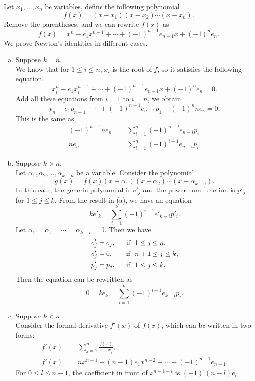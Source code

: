 \documentclass[a4paper, 12pt]{article}
\begin{document}
\begin{solution}
Let \(x_1,\ldots,x_n\) be variables, define the following polynomial 
\[f(x)=(x-x_1)(x-x_2)\cdots (x-x_n).\]
Remove the parentheses, and we can rewrite \(f(x)\) as 
\[f(x)=x^n-e_1x^{n-1}+\cdots+(-1)^{n-1}e_{n-1}x+(-1)^n e_n.\]
We prove Newton's identities in different cases.
\begin{enumerate}[(a)]
\item Suppose \(k=n\).\\ 
We know that for \(1\leq i\leq n\), \(x_i\) is the root of \(f\), so it satisfies the following equation. 
\begin{equation}
    x_i^n-e_1x_i^{n-1}+\cdots+(-1)^{n-1}e_{n-1}x+(-1)^ne_n=0.
\end{equation}
Add all these equations from \(i=1\) to \(i=n\), we obtain 
\[p_n-e_1p_{n-1}+\cdots+(-1)^{n-1}e_{n-1}p_1+(-1)^n n e_n=0.\]
This is the same as 
\begin{align*}
    (-1)^{n-1}n e_n&=\sum_{i=1}^n (-1)^{n-i} e_{n-i}p_i\\ 
              n e_n&=\sum_{i=1}^{n} (-1)^{i-1} e_{n-i}p_i.
\end{align*}
\item Suppose \(k>n\).\\ 
Let \(\alpha_1,\alpha_2,\ldots, \alpha_{k-n}\) be a variable. Consider the polynomial 
\[g(x)=f(x)(x-\alpha_1)(x-\alpha_2)\cdots(x-\alpha_{k-n}).\]
In this case, the generic polynomial is \(e'_j\) and the power sum function is \(p'_j\) for \(1\leq j\leq k\). From the result in (a), we have an equation
\[ke'_k=\sum_{i=1}^{k}(-1)^{i-1}e'_{k-i}p'_i.\]
Let \(\alpha_1=\alpha_2=\cdots=\alpha_{k-n}=0\). Then we have 
\begin{align}
    e'_j&=e_j,&&\ \ \text{if}\ \  1\leq j\leq n,\\
    e'_j&=0,&&\ \ \text{if}\ \  n+1\leq j\leq k,\\
    p'_j&=p_j,&&\ \ \text{if}\ \  1\leq j\leq k.
\end{align}
Then the equation can be rewritten as 
\[0=ke_k=\sum_{i=1}^{k}(-1)^{i-1}e_{k-i}p_i.\]
\item Suppose \(k<n\).\\ 
Consider the formal derivative \(f'(x)\) of \(f(x)\), which can be written in two forms:
\begin{align*}
    f'(x)&=\sum_{j=1}^{n}\frac{f(x)}{x-x_j},\\
    f'(x)&=nx^{n-1}-(n-1)e_1x^{n-2}+\cdots+(-1)^{n-1}e_{n-1}.
\end{align*}
For \(0\leq l\leq n-1\), the coefficient in front of \(x^{n-1-l}\) is \((-1)^l (n-l)e_l\). 

\end{enumerate}
\end{solution}
\end{document}
